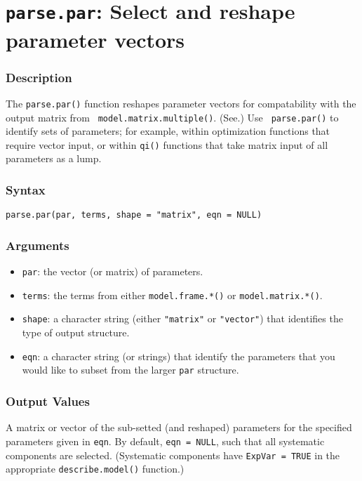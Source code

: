 \section{{\tt parse.par}: Select and reshape parameter vectors}\label{parse.par}

\subsubsection{Description}

The {\tt parse.par()} function reshapes parameter vectors for
compatability with the output matrix from {\tt
model.matrix.multiple()}. (See.)  Use {\tt
parse.par()} to identify sets of parameters; for example, within
optimization functions that require vector input, or within {\tt qi()}
functions that take matrix input of all parameters as a lump.  

\subsubsection{Syntax}
\begin{verbatim}
parse.par(par, terms, shape = "matrix", eqn = NULL)
\end{verbatim}

\subsubsection{Arguments}

\begin{itemize}
\item {\tt par}: the vector (or matrix) of parameters.
\item {\tt terms}: the terms from either {\tt model.frame.*()} or 
		{\tt model.matrix.*()}.
\item {\tt shape}: a character string (either {\tt "matrix"} or {\tt "vector"})
that identifies the type of output structure. 
\item {\tt eqn}: a character string (or strings) that identify the
parameters that you would like to subset from the larger {\tt par}
structure.
\end{itemize}

\subsubsection{Output Values}
A matrix or vector of the sub-setted (and reshaped) parameters for the specified
parameters given in {\tt eqn}.   By default, {\tt eqn = NULL}, such that all systematic
components are selected.  (Systematic components have {\tt ExpVar =
TRUE} in the appropriate {\tt describe.model()} function.)  

